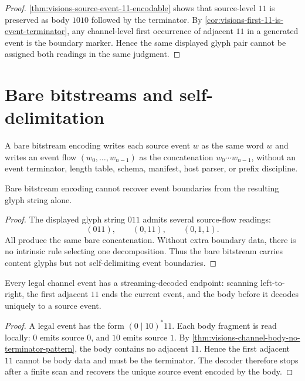 \begin{proof}
\autoref{thm:visions-source-event-11-encodable} shows that source-level
$11$ is preserved as body $1010$ followed by the terminator. By
\autoref{cor:visions-first-11-is-event-terminator}, any channel-level
first occurrence of adjacent $11$ in a generated event is the boundary
marker. Hence the same displayed glyph pair cannot be assigned both
readings in the same judgment.
\end{proof}

\section{Bare bitstreams and self-delimitation}
\label{sec:visions-bare-bitstreams-self-delimitation}

\begin{definition}
\label{def:visions-bare-bitstream-encoding}
A bare bitstream encoding writes each source event $w$ as the same word
$w$ and writes an event flow $(w_0,\ldots,w_{n-1})$ as the concatenation
$w_0\cdots w_{n-1}$, without an event terminator, length table, schema,
manifest, host parser, or prefix discipline.
\end{definition}

\begin{theorem}
\label{thm:visions-bare-bitstream-not-self-delimiting}
Bare bitstream encoding cannot recover event boundaries from the
resulting glyph string alone.
\end{theorem}

\begin{proof}
The displayed glyph string $011$ admits several source-flow readings:
$$
(011),
\qquad
(0,11),
\qquad
(0,1,1).
$$
All produce the same bare concatenation. Without extra boundary data,
there is no intrinsic rule selecting one decomposition. Thus the bare
bitstream carries content glyphs but not self-delimiting event
boundaries.
\end{proof}

\begin{theorem}
\label{thm:visions-zeckendorf-safe-channel-termination}
Every legal channel event has a streaming-decoded endpoint: scanning
left-to-right, the first adjacent $11$ ends the current event, and the
body before it decodes uniquely to a source event.
\end{theorem}

\begin{proof}
A legal event has the form $(0\mid 10)^{*}11$. Each body fragment is
read locally: $0$ emits source $0$, and $10$ emits source $1$. By
\autoref{thm:visions-channel-body-no-terminator-pattern}, the body
contains no adjacent $11$. Hence the first adjacent $11$ cannot be body
data and must be the terminator. The decoder therefore stops after a
finite scan and recovers the unique source event encoded by the body.
\end{proof}

